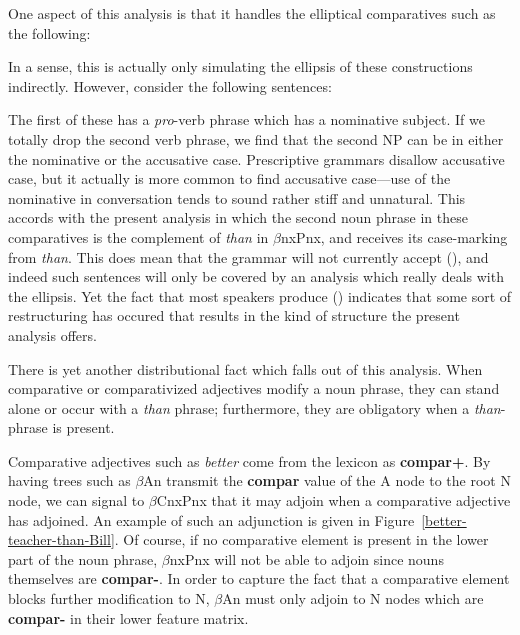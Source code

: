 One aspect of this analysis is that it handles the elliptical
comparatives such as the following:


\noindent In a sense, this is actually only simulating the ellipsis of
these constructions indirectly.  However, consider the following
sentences:


\noindent The first of these has a {\it pro}-verb phrase which has a
nominative subject.  If we totally drop the second verb phrase, we
find that the second NP can be in either the nominative or the
accusative case.  Prescriptive grammars disallow accusative case, but
it actually is more common to find accusative case---use of the
nominative in conversation tends to sound rather stiff and unnatural.
This accords with the present analysis in which the second noun phrase
in these comparatives is the complement of {\it than} in $\beta$nxPnx,
and receives its case-marking from {\it than}.  This does mean that
the grammar will not currently accept (), and indeed such
sentences will only be covered by an analysis which really deals with
the ellipsis.  Yet the fact that most speakers produce ()
indicates that some sort of restructuring has occured that results in
the kind of structure the present analysis offers.

There is yet another distributional fact which falls out of this
analysis.  When comparative or comparativized adjectives modify a noun
phrase, they can stand alone or occur with a {\it than} phrase;
furthermore, they are obligatory when a {\it than}-phrase is present.


\noindent Comparative adjectives such as {\it better} 
come from the lexicon as {\bf compar+}.  By having trees such as
$\beta$An transmit the {\bf compar} value of the A node to the root
N node, we can signal to $\beta$CnxPnx that it may adjoin when a
comparative adjective has adjoined.  An example of such an adjunction
is given in Figure~\ref{better-teacher-than-Bill}. Of course, if no
comparative element is present in the lower part of the noun phrase,
$\beta$nxPnx will not be able to adjoin since nouns themselves are
{\bf compar-}.  In order to capture the fact that a comparative
element blocks further modification to N, $\beta$An must only adjoin
to N nodes which are {\bf compar-} in their lower feature matrix.

